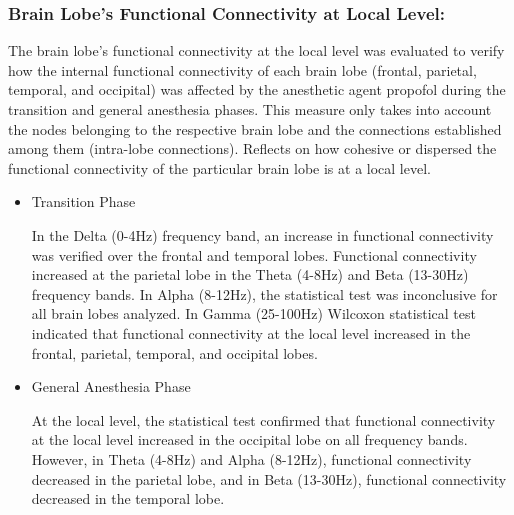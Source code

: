 \documentclass[twoside]{article}
\begin{document}
\begin{multicols}{2}
\begin{itemize}
\end{itemize}



\subsubsection{Brain Lobe's Functional Connectivity at Local Level:}


The brain lobe's functional connectivity at the local level was evaluated to verify how the internal functional connectivity of each brain lobe (frontal, parietal, temporal, and occipital) was affected by the anesthetic agent propofol during the transition and general anesthesia phases. This measure only takes into account the nodes belonging to the respective brain lobe and the connections established among them (intra-lobe connections). Reflects on how cohesive or dispersed the functional connectivity of the particular brain lobe is at a local level.


\begin{itemize}


\item Transition Phase

In the Delta (0-4Hz) frequency band, an increase in functional connectivity was verified over the frontal and temporal lobes.
Functional connectivity increased at the parietal lobe in the Theta (4-8Hz) and Beta (13-30Hz) frequency bands.
In Alpha (8-12Hz), the statistical test was inconclusive for all brain lobes analyzed. 
In Gamma (25-100Hz) Wilcoxon statistical test indicated that functional connectivity at the local level increased in the frontal, parietal, temporal, and occipital lobes. 

\item General Anesthesia Phase

At the local level, the statistical test confirmed that functional connectivity at the local level increased in the occipital lobe on all frequency bands. However, in Theta (4-8Hz) and Alpha (8-12Hz), functional connectivity decreased in the parietal lobe, and in Beta (13-30Hz), functional connectivity decreased in the temporal lobe.

\end{itemize}




\end{multicols}
\end{document}
